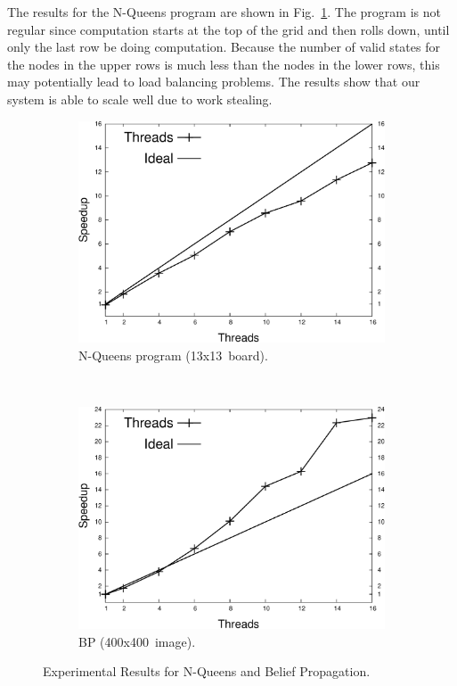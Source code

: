 The results for the N-Queens program are shown in Fig.~\ref{exp:8queens}. The program is not regular since computation starts at the top of the grid and then rolls down, until only the last row be doing computation. Because the number of valid states for the nodes in the upper rows is much less than the nodes in the lower rows, this may potentially lead to
load balancing problems. The results show that our system is able to scale well due to work stealing.

\begin{figure}[h]
   \vspace{-0.7\intextsep}
   \centering
   \begin{subfigure}[b]{\plotsize}
      \includegraphics[width=\textwidth]{speedup_8queens-13.pdf}
      \caption{N-Queens program (13x13~board).}
      \label{exp:8queens}
   \end{subfigure}
   ~~~~
   \begin{subfigure}[b]{\plotsize}
      \includegraphics[width=\textwidth]{speedup_bp-400.pdf}
      \caption{BP (400x400~image).}
      \label{exp:bp}
   \end{subfigure}
   \caption{Experimental Results for N-Queens and Belief Propagation.}
   \vspace{-0.1\intextsep}
\end{figure}

